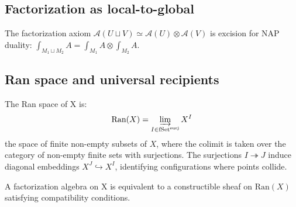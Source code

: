 \subsection{Factorization as local-to-global}

\begin{remark}\label{princ:factorization-locality}
The factorization axiom $\mathcal{A}(U \sqcup V) \simeq \mathcal{A}(U) \otimes \mathcal{A}(V)$ is excision for NAP duality: $\int_{M_1 \sqcup M_2} A = \int_{M_1} A \otimes \int_{M_2} A$.
\end{remark}

\subsection{Ran space and universal recipients}

\begin{definition}\label{def:ran-space}
The Ran space of X is:
\[\text{Ran}(X) = \varinjlim_{I \in \text{fSet}^{\text{surj}}} X^I\]
the space of finite non-empty subsets of $X$, where the colimit is taken over the category of non-empty finite sets with surjections. The surjections $I \twoheadrightarrow J$ induce diagonal embeddings $X^J \hookrightarrow X^I$, identifying configurations where points collide.

A factorization algebra on X is equivalent to a constructible sheaf on $\text{Ran}(X)$ satisfying compatibility conditions.
\end{definition}

